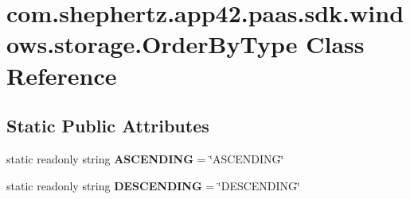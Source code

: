 \hypertarget{classcom_1_1shephertz_1_1app42_1_1paas_1_1sdk_1_1windows_1_1storage_1_1_order_by_type}{\section{com.\+shephertz.\+app42.\+paas.\+sdk.\+windows.\+storage.\+Order\+By\+Type Class Reference}
\label{classcom_1_1shephertz_1_1app42_1_1paas_1_1sdk_1_1windows_1_1storage_1_1_order_by_type}
}
\subsection*{Static Public Attributes}
\begin{DoxyCompactItemize}
\item 
\hypertarget{classcom_1_1shephertz_1_1app42_1_1paas_1_1sdk_1_1windows_1_1storage_1_1_order_by_type_a935869440f104d390acdd03dc9bbd5f7}{static readonly string {\bfseries A\+S\+C\+E\+N\+D\+I\+N\+G} = \char`\"{}A\+S\+C\+E\+N\+D\+I\+N\+G\char`\"{}}\label{classcom_1_1shephertz_1_1app42_1_1paas_1_1sdk_1_1windows_1_1storage_1_1_order_by_type_a935869440f104d390acdd03dc9bbd5f7}

\item 
\hypertarget{classcom_1_1shephertz_1_1app42_1_1paas_1_1sdk_1_1windows_1_1storage_1_1_order_by_type_ad21b3a4c16546a9e49f50ff16c11192d}{static readonly string {\bfseries D\+E\+S\+C\+E\+N\+D\+I\+N\+G} = \char`\"{}D\+E\+S\+C\+E\+N\+D\+I\+N\+G\char`\"{}}\label{classcom_1_1shephertz_1_1app42_1_1paas_1_1sdk_1_1windows_1_1storage_1_1_order_by_type_ad21b3a4c16546a9e49f50ff16c11192d}

\end{DoxyCompactItemize}
